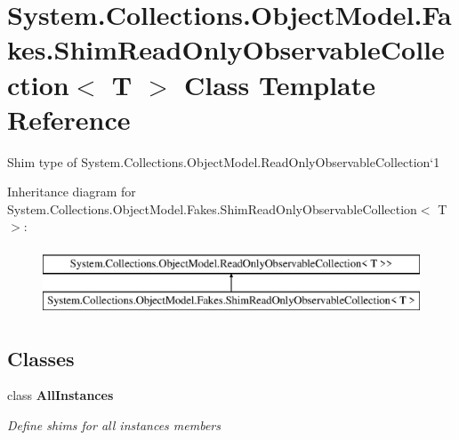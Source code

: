 \hypertarget{class_system_1_1_collections_1_1_object_model_1_1_fakes_1_1_shim_read_only_observable_collection_3_01_t_01_4}{\section{System.\-Collections.\-Object\-Model.\-Fakes.\-Shim\-Read\-Only\-Observable\-Collection$<$ T $>$ Class Template Reference}
\label{class_system_1_1_collections_1_1_object_model_1_1_fakes_1_1_shim_read_only_observable_collection_3_01_t_01_4}
}


Shim type of System.\-Collections.\-Object\-Model.\-Read\-Only\-Observable\-Collection`1 


Inheritance diagram for System.\-Collections.\-Object\-Model.\-Fakes.\-Shim\-Read\-Only\-Observable\-Collection$<$ T $>$\-:\begin{figure}[H]
\begin{center}
\leavevmode
\includegraphics[height=2.000000cm]{class_system_1_1_collections_1_1_object_model_1_1_fakes_1_1_shim_read_only_observable_collection_3_01_t_01_4}
\end{center}
\end{figure}
\subsection*{Classes}
\begin{DoxyCompactItemize}
\item 
class {\bfseries All\-Instances}
\begin{DoxyCompactList}\small\item\em Define shims for all instances members\end{DoxyCompactList}\end{DoxyCompactItemize}
